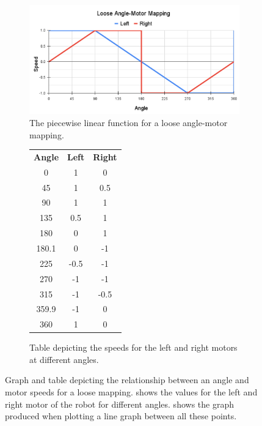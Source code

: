 \documentclass{l4proj}
\begin{document}
\begin{figure}[!h]
    \centering
    \begin{subfigure}[b]{0.75\textwidth}
        \includegraphics[width=\textwidth]{images/Loose Angle-Motor Mapping.pdf}
        \caption{The piecewise linear function for a loose angle-motor mapping.}
        \label{fig:loose-mapping-graph}
    \end{subfigure}
    \begin{subfigure}[b]{0.24\textwidth}
        \begin{tabular}{ccc}
            \textbf{Angle} & \textbf{Left} & \textbf{Right} \\
            0 & 1 & 0 \\
            45 & 1 & 0.5 \\
            90 & 1 & 1 \\
            135 & 0.5 & 1 \\
            180 & 0 & 1 \\
            180.1 & 0 & -1 \\
            225 & -0.5 & -1 \\
            270 & -1 & -1 \\
            315 & -1 & -0.5 \\
            359.9 & -1 & 0 \\
            360 & 1 & 0
        \end{tabular}
        \caption{Table depicting the speeds for the left and right motors at different angles.}
        \label{tab:loose-mapping-table}
    \end{subfigure}
    \caption{Graph and table depicting the relationship between an angle and motor speeds for a loose mapping.  shows the values for the left and right motor of the robot for different angles.  shows the graph produced when plotting a line graph between all these points.}
    \label{fig:loose-mapping}
\end{figure}
\end{document}
